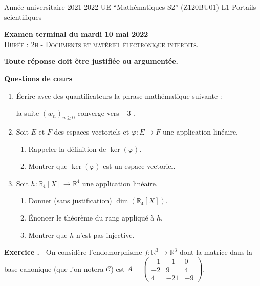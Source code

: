 \documentclass[10pt,a4paper,french]{article}
\newcounter{exono}
\newcounter{questionno}
\newcommand\exo
  {\addtocounter{exono}{1}
   \bigbreak\textbf{Exercice \theexono.\ }
   \setcounter{questionno}{0}}
\newcommand\R{{\mathbb{R}}}
\begin{document}
{} \hfill Année universitaire 2021-2022 \newline UE ``Mathématiques S2'' (Z120BU01) \hfill L1 Portails scientifiques

\begin{center}
  \textbf{Examen terminal du mardi 10 mai 2022} \\
  \textsc{Durée : 2h - Documents et mat\'eriel \'electronique interdits.}
  
  \textbf{Toute réponse doit être justifiée ou argumentée.}
\end{center}

{\bf Questions de cours}
\begin{enumerate}
    \item \'Ecrire avec des quantificateurs la phrase mathématique suivante : 
    
    \og la suite $(w_n)_{n \geq 0}$ converge vers $-3$ \fg.
    \item Soit $E$ et $F$ des espaces vectoriels et $\varphi : E \to F$ une application linéaire. 
    \begin{enumerate}
     \item Rappeler la d\'efinition de $\ker(\varphi)$.
     \item Montrer que $\ker(\varphi)$ est un espace vectoriel.
    \end{enumerate}
    \item Soit $h : \R_4[X] \to \R^4$ une application linéaire. 
    \begin{enumerate}
     \item Donner (sans justification) $\dim(\R_4[X])$.
        \item \'Enoncer le théorème du rang appliqué à $h$.
        \item Montrer que $h$ n'est pas injective.
    \end{enumerate}
\end{enumerate}

\exo
On considère l'endomorphisme $f : \R^3 \to \R^3$ dont la matrice dans la base canonique (que l'on notera $\mathcal{C}$) est  $A=\begin{pmatrix} -1 & -1 & 0 \\ -2 & 9 & 4 \\ 4 & -21 & -9 \end{pmatrix}$. 
\end{document}
